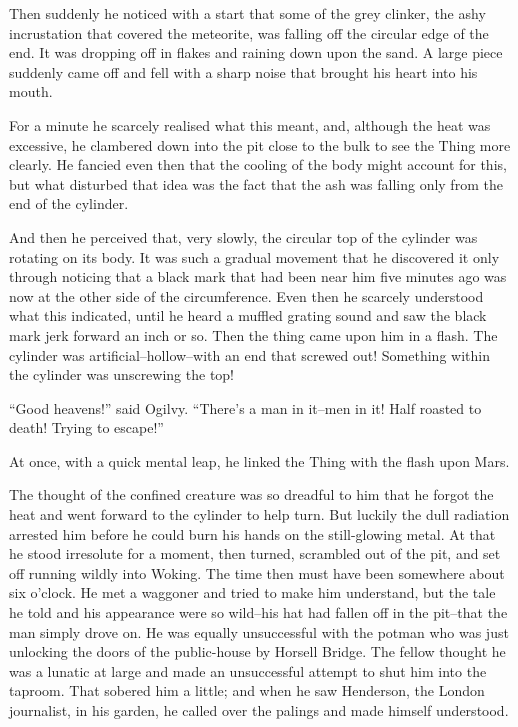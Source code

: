 Then suddenly he noticed with a start that some of the grey
clinker, the ashy incrustation that covered the meteorite, was
falling off the circular edge of the end. It was dropping off in
flakes and raining down upon the sand. A large piece suddenly came
off and fell with a sharp noise that brought his heart into his
mouth.

For a minute he scarcely realised what this meant, and, although
the heat was excessive, he clambered down into the pit close to the
bulk to see the Thing more clearly. He fancied even then that the
cooling of the body might account for this, but what disturbed that
idea was the fact that the ash was falling only from the end of the
cylinder.

And then he perceived that, very slowly, the circular top of the
cylinder was rotating on its body. It was such a gradual movement
that he discovered it only through noticing that a black mark that
had been near him five minutes ago was now at the other side of the
circumference. Even then he scarcely understood what this
indicated, until he heard a muffled grating sound and saw the black
mark jerk forward an inch or so. Then the thing came upon him in a
flash. The cylinder was artificial--hollow--with an end that
screwed out! Something within the cylinder was unscrewing the top!

``Good heavens!'' said Ogilvy. ``There's a man in it--men in it! Half
roasted to death! Trying to escape!''

At once, with a quick mental leap, he linked the Thing with the
flash upon Mars.

The thought of the confined creature was so dreadful to him that he
forgot the heat and went forward to the cylinder to help turn. But
luckily the dull radiation arrested him before he could burn his
hands on the still-glowing metal. At that he stood irresolute for a
moment, then turned, scrambled out of the pit, and set off running
wildly into Woking. The time then must have been somewhere about
six o'clock. He met a waggoner and tried to make him understand,
but the tale he told and his appearance were so wild--his hat had
fallen off in the pit--that the man simply drove on. He was equally
unsuccessful with the potman who was just unlocking the doors of
the public-house by Horsell Bridge. The fellow thought he was a
lunatic at large and made an unsuccessful attempt to shut him into
the taproom. That sobered him a little; and when he saw Henderson,
the London journalist, in his garden, he called over the palings
and made himself understood.

